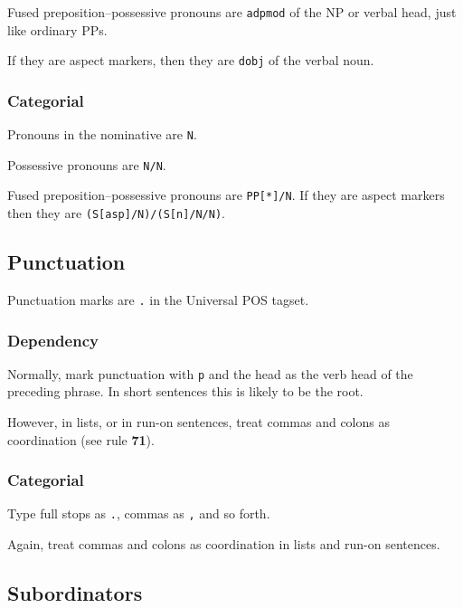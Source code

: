 \documentclass[a4paper]{article}
\begin{document}
 Fused preposition--possessive pronouns are \texttt{adpmod} of the NP or verbal head, just like ordinary PPs.

 If they are aspect markers, then they are \texttt{dobj} of the verbal noun.

\subsubsection*{Categorial}

 Pronouns in the nominative are \texttt{N}.

 Possessive pronouns are \texttt{N/N}.

 Fused preposition--possessive pronouns are \texttt{PP[*]/N}.
If they are aspect markers then they are \texttt{(S[asp]/N)/(S[n]/N/N)}.

\subsection{Punctuation\label{subsect:punctuation}}

Punctuation marks are \texttt{.} in the Universal POS tagset.

\subsubsection*{Dependency}
 Normally, mark punctuation with \texttt{p} and the head as the verb head of the preceding phrase. In short sentences this is likely to be the root.

 However, in lists, or in run-on sentences, treat commas and colons as coordination (see rule \textbf{71}).

\subsubsection*{Categorial}

 Type full stops as \texttt{.}, commas as \texttt{,} and so forth.

 Again, treat commas and colons as coordination in lists and run-on sentences.

\subsection{Subordinators\label{subsect:subordinators}}
\end{document}
